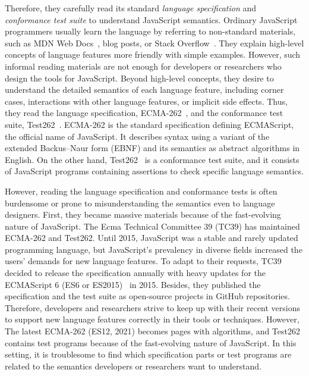 Therefore, they carefully read its standard \textit{language specification} and
\textit{conformance test suite} to understand JavaScript semantics.  Ordinary
JavaScript programmers usually learn the language by referring to non-standard
materials, such as MDN Web Docs~\cite{mdn-doc}, blog posts, or Stack
Overflow~\cite{stackoverflow}.  They explain high-level concepts of language
features more friendly with simple examples.  However, such informal reading
materials are not enough for developers or researchers who design the tools for
JavaScript.  Beyond high-level concepts, they desire to understand the detailed
semantics of each language feature, including corner cases, interactions with
other language features, or implicit side effects. Thus, they read the language
specification, ECMA-262~\cite{es12}, and the conformance test suite,
Test262~\cite{test262}.  ECMA-262 is the standard specification defining
ECMAScript, the official name of JavaScript.  It describes syntax using a
variant of the extended Backus–Naur form (EBNF) and its semantics as abstract
algorithms in English.  On the other hand, Test262~\cite{test262} is a
conformance test suite, and it consists of JavaScript programs containing
assertions to check specific language semantics.

However, reading the language specification and conformance tests is often
burdensome or prone to misunderstanding the semantics even to language
designers.  First, they became massive materials because of the fast-evolving
nature of JavaScript.  The Ecma Technical Committee 39 (TC39) has maintained
ECMA-262 and Test262.  Until 2015, JavaScript was a stable and rarely updated
programming language, but JavaScript's prevalency in diverse fields increased
the users' demands for new language features.  To adapt to their requests, TC39
decided to release the specification annually with heavy updates for the
ECMAScript 6 (ES6 or ES2015)~\cite{es6} in 2015.  Besides, they published the
specification and the test suite as open-source projects in GitHub repositories.
Therefore, developers and researchers strive to keep up with their recent
versions to support new language features correctly in their tools or
techniques.  However, The latest ECMA-262 (ES12, 2021) becomes 
pages with  algorithms, and Test262 contains  test
programs because of the fast-evolving nature of JavaScript.  In this setting, it
is troublesome to find which specification parts or test programs are related to
the semantics developers or researchers want to understand.

